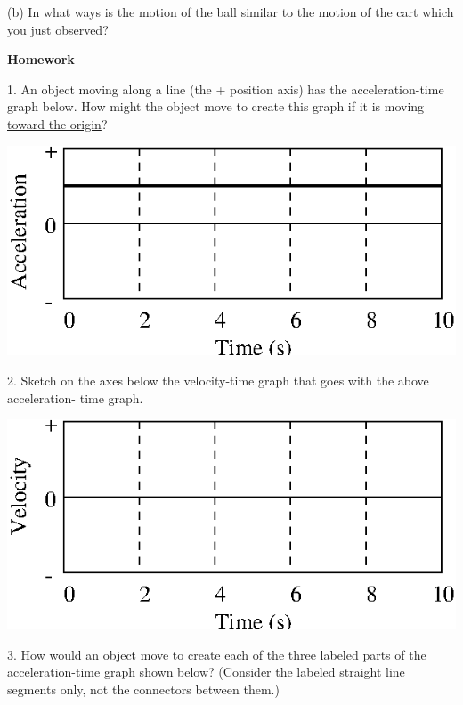 (b) In what ways is the motion of the ball similar to the motion of the cart
which you just observed?
\answerspace{10mm}

\pagebreak[3]
\textbf{Homework} 

1. An object moving along a line (the + position axis) has the acceleration-time graph below. How might the object move to create this graph if it is moving
\underline{toward the origin}?

\vspace{0.3cm}
{\par\centering \includegraphics{slowing/slowing_fig6.eps} \par}
\vspace{0.3cm}

2. Sketch on the axes below the velocity-time graph that goes with the above
acceleration- time graph.

\vspace{0.3cm}
{\par\centering \includegraphics{slowing/slowing_fig7.eps} \par}
\vspace{0.3cm}

3. How would an object move to create each of the three labeled parts of the
acceleration-time graph shown below? (Consider the labeled straight line segments only, not the connectors between them.)

